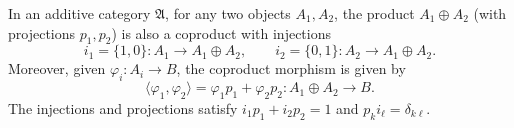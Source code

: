 In an additive category $\mathfrak{A}$, for any two objects $A_1, A_2$, the product $A_1 \oplus A_2$ (with projections $p_1, p_2$) is also a coproduct with injections
$$
i_1 = \{1, 0\} : A_1 \to A_1 \oplus A_2, \qquad i_2 = \{0, 1\} : A_2 \to A_1 \oplus A_2.
$$
Moreover, given $\varphi_i : A_i \to B$, the coproduct morphism is given by
$$
\langle \varphi_1, \varphi_2 \rangle = \varphi_1 p_1 + \varphi_2 p_2 : A_1 \oplus A_2 \to B.
$$
The injections and projections satisfy $i_1 p_1 + i_2 p_2 = 1$ and $p_k i_\ell = \delta_{k\ell}$.
